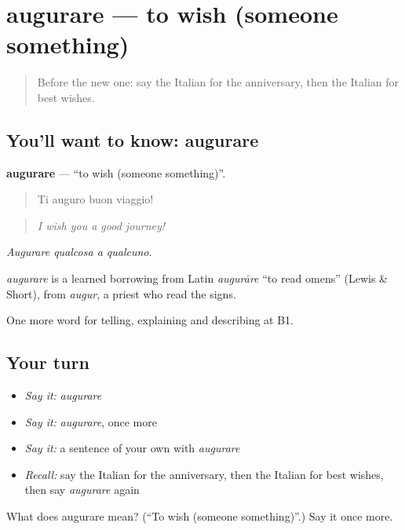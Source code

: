 \section[augurare]{augurare — to wish (someone something)}

\label{lesson:IT-C315-augurare}



\begin{quote}
Before the new one: say the Italian for the anniversary, then the Italian for best wishes.
\end{quote}

\subsection*{You'll want to know: augurare}
\textbf{augurare} — \textquotedblleft{}to wish (someone something)\textquotedblright{}.

\begin{quote}
Ti auguro buon viaggio!
\end{quote}

\begin{quote}
\emph{I wish you a good journey!}
\end{quote}

\emph{Augurare qualcosa a qualcuno}.

\begin{cousinweb}
\emph{augurare} is a learned borrowing from Latin \emph{augurāre} \textquotedblleft{}to read omens\textquotedblright{} (Lewis \& Short), from \emph{augur}, a priest who read the signs.
\end{cousinweb}

\begin{grammarlens}[title={What you've built}]
One more word for telling, explaining and describing at B1.
\end{grammarlens}

\subsection*{Your turn}
\begin{itemize}
\raggedright
  \item \emph{Say it:} \emph{augurare}
  \item \emph{Say it:} \emph{augurare}, once more
  \item \emph{Say it:} a sentence of your own with \emph{augurare}
  \item \emph{Recall:} say the Italian for the anniversary, then the Italian for best wishes, then say \emph{augurare} again
\end{itemize}

\begin{tcolorbox}[breakable,colback=teal!4,colframe=teal!35!black,title={Before you move on}]
What does augurare mean? (\textquotedblleft{}To wish (someone something)\textquotedblright{}.) Say it once more.
\end{tcolorbox}
